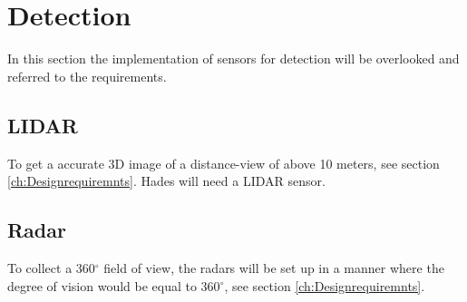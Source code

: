 \begin{itemize}
\end{itemize}

\section{Detection} \label{ch:detectionHades}
In this section the implementation of sensors for detection will be overlooked and referred to the requirements.

\subsection{LIDAR}
To get a accurate 3D image of a distance-view of above 10 meters, see section \ref{ch:Designrequiremnts}. Hades will need a LIDAR sensor.

\subsection{Radar}
To collect a 360${^\circ}$ field of view, the radars will be set up in a manner where the degree of vision would be equal to 360${^\circ}$, see section \ref{ch:Designrequiremnts}.

